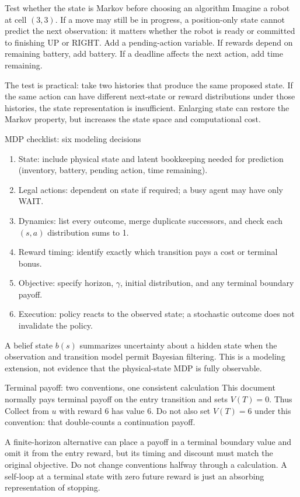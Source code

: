 \documentclass[10pt,a4paper]{article}
\begin{document}
\begin{card}{Test whether the state is Markov before choosing an algorithm}
Imagine a robot at cell $(3,3)$. If a move may still be in progress, a position-only state cannot predict the next observation: it matters whether the robot is ready or committed to finishing UP or RIGHT. Add a pending-action variable. If rewards depend on remaining battery, add battery. If a deadline affects the next action, add time remaining.

The test is practical: take two histories that produce the same proposed state. If the same action can have different next-state or reward distributions under those histories, the state representation is insufficient. Enlarging state can restore the Markov property, but increases the state space and computational cost.
\end{card}
\begin{card}{MDP checklist: six modeling decisions}
\begin{enumerate}
\item State: include physical state and latent bookkeeping needed for prediction (inventory, battery, pending action, time remaining).
\item Legal actions: dependent on state if required; a busy agent may have only WAIT.
\item Dynamics: list every outcome, merge duplicate successors, and check each $(s,a)$ distribution sums to 1.
\item Reward timing: identify exactly which transition pays a cost or terminal bonus.
\item Objective: specify horizon, $\gamma$, initial distribution, and any terminal boundary payoff.
\item Execution: policy reacts to the observed state; a stochastic outcome does not invalidate the policy.
\end{enumerate}
A belief state $b(s)$ summarizes uncertainty about a hidden state when the observation and transition model permit Bayesian filtering. This is a modeling extension, not evidence that the physical-state MDP is fully observable.
\end{card}

\begin{card}{Terminal payoff: two conventions, one consistent calculation}
This document normally pays terminal payoff on the entry transition and sets $V(T)=0$. Thus Collect from $u$ with reward 6 has value 6. Do not also set $V(T)=6$ under this convention: that double-counts a continuation payoff.

A finite-horizon alternative can place a payoff in a terminal boundary value and omit it from the entry reward, but its timing and discount must match the original objective. Do not change conventions halfway through a calculation. A self-loop at a terminal state with zero future reward is just an absorbing representation of stopping.
\end{card}
\end{document}
